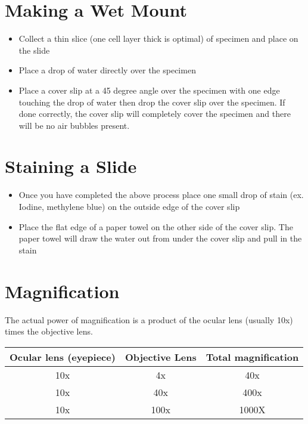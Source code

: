 \section{Making a Wet Mount}

\begin{itemize}

\item{Collect a thin slice (one cell layer thick is optimal) of specimen and place on the slide}

\item{Place a drop of water directly over the specimen}

\item{Place a cover slip at a 45 degree angle over the specimen with one edge touching the drop of water then drop the cover slip over the specimen. If done correctly, the cover slip will completely cover the specimen and there will be no air bubbles present.}

\end{itemize}

\section{Staining a Slide}

\begin{itemize}

\item{Once you have completed the above process place one small drop of stain (ex. Iodine, methylene blue) on the outside edge of the cover slip}

\item{Place the flat edge of a paper towel on the other side of the cover slip. The paper towel will draw the water out from under the cover slip and pull in the stain}

\end{itemize}

\section{Magnification}
The actual power of magnification is a product of the ocular lens (usually 10x) times the objective lens.

\begin{center}
\begin{tabular}{ c | c | c | }
\hline
Ocular lens (eyepiece) & Objective Lens & Total magnification \\ \hline
10x & 4x & 40x \\ \hline
10x & 40x & 400x \\ \hline
10x & 100x & 1000X \\
\hline
\end{tabular}
\end{center}

